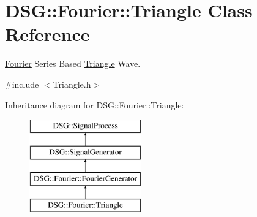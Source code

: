 \hypertarget{classDSG_1_1Fourier_1_1Triangle}{\section{D\-S\-G\-:\-:Fourier\-:\-:Triangle Class Reference}
\label{classDSG_1_1Fourier_1_1Triangle}
}


\hyperlink{namespaceDSG_1_1Fourier}{Fourier} Series Based \hyperlink{classDSG_1_1Fourier_1_1Triangle}{Triangle} Wave.  




{\ttfamily \#include $<$Triangle.\-h$>$}

Inheritance diagram for D\-S\-G\-:\-:Fourier\-:\-:Triangle\-:\begin{figure}[H]
\begin{center}
\leavevmode
\includegraphics[height=4.000000cm]{classDSG_1_1Fourier_1_1Triangle}
\end{center}
\end{figure}
